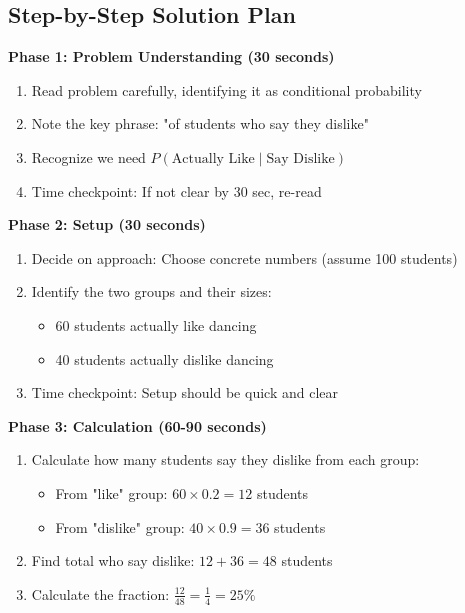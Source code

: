 \documentclass[]{article}
\begin{document}
\begin{solutionbox}
\subsection*{Step-by-Step Solution Plan}

\textbf{Phase 1: Problem Understanding (30 seconds)}
\begin{enumerate}[leftmargin=*]
    \item Read problem carefully, identifying it as conditional probability
    \item Note the key phrase: "of students who say they dislike"
    \item Recognize we need $P(\text{Actually Like} \mid \text{Say Dislike})$
    \item Time checkpoint: If not clear by 30 sec, re-read
\end{enumerate}

\textbf{Phase 2: Setup (30 seconds)}
\begin{enumerate}[leftmargin=*]
    \item Decide on approach: Choose concrete numbers (assume 100 students)
    \item Identify the two groups and their sizes:
    \begin{itemize}
        \item 60 students actually like dancing
        \item 40 students actually dislike dancing
    \end{itemize}
    \item Time checkpoint: Setup should be quick and clear
\end{enumerate}

\textbf{Phase 3: Calculation (60-90 seconds)}
\begin{enumerate}[leftmargin=*]
    \item Calculate how many students say they dislike from each group:
    \begin{itemize}
        \item From "like" group: $60 \times 0.2 = 12$ students
        \item From "dislike" group: $40 \times 0.9 = 36$ students
    \end{itemize}
    
    \item Find total who say dislike: $12 + 36 = 48$ students
    
    \item Calculate the fraction: $\frac{12}{48} = \frac{1}{4} = 25\%$
    

\end{enumerate}
\end{solutionbox}
\end{document}
